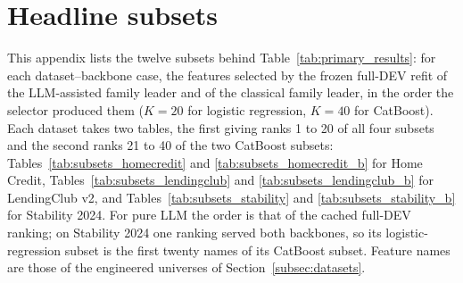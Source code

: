 \documentclass[final,5p,twocolumn]{elsarticle}
\newcommand{\Kfeat}{K}
\begin{document}
\section{Headline subsets}
\label{app:subsets}
\setcounter{table}{0}\setcounter{figure}{0}

This appendix lists the twelve subsets behind Table~\ref{tab:primary_results}: for each dataset--backbone case, the features selected by the frozen full-DEV refit of the LLM-assisted family leader and of the classical family leader, in the order the selector produced them ($\Kfeat=20$ for logistic regression, $\Kfeat=40$ for CatBoost). Each dataset takes two tables, the first giving ranks 1 to 20 of all four subsets and the second ranks 21 to 40 of the two CatBoost subsets: Tables~\ref{tab:subsets_homecredit} and \ref{tab:subsets_homecredit_b} for Home Credit, Tables~\ref{tab:subsets_lendingclub} and \ref{tab:subsets_lendingclub_b} for LendingClub v2, and Tables~\ref{tab:subsets_stability} and \ref{tab:subsets_stability_b} for Stability 2024. For pure LLM the order is that of the cached full-DEV ranking; on Stability 2024 one ranking served both backbones, so its logistic-regression subset is the first twenty names of its CatBoost subset. Feature names are those of the engineered universes of Section~\ref{subsec:datasets}.
\end{document}

